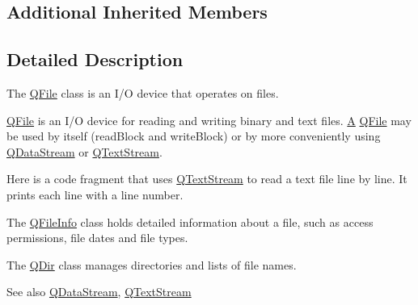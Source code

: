 \subsection*{Additional Inherited Members}


\subsection{Detailed Description}
The \mbox{\hyperlink{class_q_file}{Q\+File}} class is an I/O device that operates on files. 

\mbox{\hyperlink{class_q_file}{Q\+File}} is an I/O device for reading and writing binary and text files. \mbox{\hyperlink{class_a}{A}} \mbox{\hyperlink{class_q_file}{Q\+File}} may be used by itself (read\+Block and write\+Block) or by more conveniently using \mbox{\hyperlink{class_q_data_stream}{Q\+Data\+Stream}} or \mbox{\hyperlink{class_q_text_stream}{Q\+Text\+Stream}}.

Here is a code fragment that uses \mbox{\hyperlink{class_q_text_stream}{Q\+Text\+Stream}} to read a text file line by line. It prints each line with a line number. 
\begin{DoxyCode}{0}
\DoxyCodeLine{\}}
\DoxyCodeLine{\}}
\end{DoxyCode}


The \mbox{\hyperlink{class_q_file_info}{Q\+File\+Info}} class holds detailed information about a file, such as access permissions, file dates and file types.

The \mbox{\hyperlink{class_q_dir}{Q\+Dir}} class manages directories and lists of file names.

\begin{DoxySeeAlso}{See also}
\mbox{\hyperlink{class_q_data_stream}{Q\+Data\+Stream}}, \mbox{\hyperlink{class_q_text_stream}{Q\+Text\+Stream}} 
\end{DoxySeeAlso}


